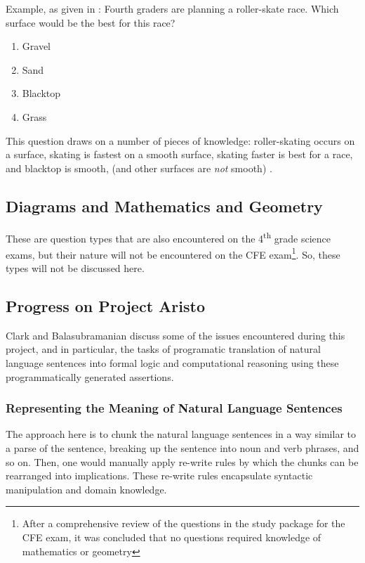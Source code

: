 Example, as given in \cite{clark2015elementary}:  Fourth graders are planning a roller-skate race.  Which surface would be the best for this race?  

\begin{enumerate}[label=\Alph*.]
\item Gravel
\item Sand
\item Blacktop
\item Grass
\end{enumerate}

This question draws on a number of pieces of knowledge: roller-skating occurs on a surface, skating is fastest on a smooth surface, skating faster is best for a race, and  blacktop is smooth, (and other surfaces are \emph{not} smooth) \cite{clark2015elementary}.

\subsection{Diagrams and Mathematics and Geometry}

These are question types that are also encountered on the 4\textsuperscript{th} grade science exams, but their nature will not be encountered on the CFE exam\footnote{After a comprehensive review of the questions in the study package for the CFE exam, it was concluded that no questions required knowledge of mathematics or geometry}.  So, these types will not be discussed here.

\subsection{Progress on Project Aristo}

Clark and Balasubramanian \cite{clark2014interpreting} discuss some of the issues encountered during this project, and in particular, the tasks of programatic translation of natural language sentences into formal logic and computational reasoning using these programmatically generated assertions.

\subsubsection{Representing the Meaning of Natural Language Sentences}

The approach here is to chunk the natural language sentences in a way similar to a parse of the sentence, breaking up the sentence into noun and verb phrases, and so on.  Then, one would manually apply re-write rules by which the chunks can be rearranged into implications.  These re-write rules encapsulate syntactic manipulation and domain knowledge.

